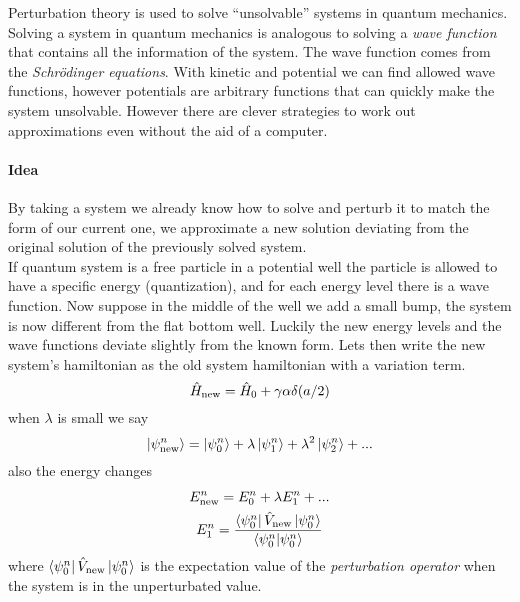 \begin{multicols}{3}
  Perturbation theory is used to solve ``unsolvable'' systems in quantum mechanics. Solving a system in quantum mechanics is analogous to solving
  a \textit{wave function} that contains all the information of the system. The wave function comes from the \textit{Schr\"odinger equations}.
  With kinetic and potential we can find allowed wave functions, however potentials are arbitrary functions that can quickly make the system unsolvable.
  However there are clever strategies to work out approximations even without the aid of a computer. \\
  
  \paragraph{\textbf{Idea}}
  By taking a system we already know how to solve and perturb it to match the form of our current one, we approximate a new solution deviating from the
  original solution of the previously solved system. \\

  If quantum system is a free particle in a potential well the particle is allowed to have a specific energy (quantization), and for each energy
  level there is a wave function. Now suppose in the middle of the well we add a small bump, the system is now different from the flat bottom well.
  Luckily the new energy levels and the wave functions deviate slightly from the known form.
  Lets then write the new system's hamiltonian as the old system hamiltonian with a variation term.
  \begin{equation*}
    \hat{H}_{\text{\text{new}}} = \hat{H}_0 + \gamma \alpha \delta (a/2)
  \end{equation*}
  when $\lambda$ is small we say
  \begin{equation*}
    \ket{\psi_{\text{new}}^n} = \ket{\psi_0^n} + \lambda \ket{\psi_1^n} + \lambda^2 \ket{\psi_2 ^n} + ...
  \end{equation*}
  also the energy changes
  \begin{equation*}
    \begin{gathered}
      E_{\text{new}}^n = E_0^n + \lambda E_1^n + ... \\
      E_1^n = \frac{\bra{\psi_0^n}\hat{V}_{\text{new}} \ket{\psi_0^n}}{\bra{\psi_0^n}\ket{\psi_0^n}}
    \end{gathered}
  \end{equation*}
  where $\bra{\psi_0^n} \hat{V}_{\text{new}} \ket{\psi_0^n}$ is the expectation value of the \textit{perturbation operator}
  when the system is in the unperturbated value.
\end{multicols}

